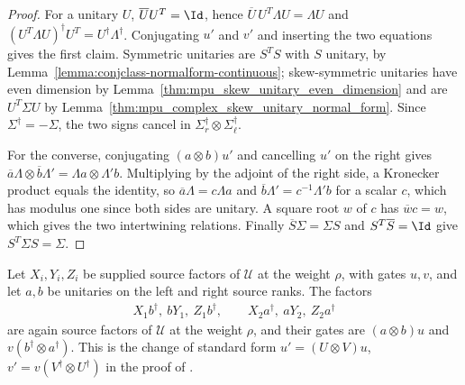 \begin{proof}
    \leanok
    For a unitary $U$, $\overline UU^T=\Id$, hence
    $\overline U\,U^T\Lambda U=\Lambda U$ and
    $(U^T\Lambda U)^\dagger U^T=U^\dagger\Lambda^\dagger$. Conjugating $u'$
    and $v'$ and inserting the two equations gives the first claim. Symmetric
    unitaries are $S^TS$ with $S$ unitary, by
    Lemma~\ref{lemma:conjclass-normalform-continuous}; skew-symmetric
    unitaries have even dimension by
    Lemma~\ref{thm:mpu_skew_unitary_even_dimension} and are $U^T\Sigma U$ by
    Lemma~\ref{thm:mpu_complex_skew_unitary_normal_form}. Since
    $\Sigma^\dagger=-\Sigma$, the two signs cancel in
    $\Sigma_r^\dagger\otimes\Sigma_\ell^\dagger$.

    For the converse, conjugating $(a\otimes b)u'$ and cancelling $u'$ on the
    right gives
    $\overline a\Lambda\otimes\overline b\Lambda'=\Lambda a\otimes\Lambda' b$.
    Multiplying by the adjoint of the right side, a Kronecker product equals
    the identity, so $\overline a\Lambda=c\Lambda a$ and
    $\overline b\Lambda'=c^{-1}\Lambda'b$ for a scalar $c$, which has modulus
    one since both sides are unitary. A square root $w$ of $c$ has
    $\overline wc=w$, which gives the two intertwining relations. Finally
    $\overline S\Sigma=\Sigma S$ and $S^T\overline S=\Id$ give
    $S^T\Sigma S=\Sigma$.
\end{proof}

\begin{definition}
    \label{def:mpu_source_factor_rank_gauge}
    \leanok
    Let $X_i,Y_i,Z_i$ be supplied source factors of $\mathcal U$ at the weight
    $\rho$, with gates $u,v$, and let $a,b$ be unitaries on the left and
    right source ranks. The factors
    \begin{align}
        X_1b^\dagger,\ bY_1,\ Z_1b^\dagger,\qquad
        X_2a^\dagger,\ aY_2,\ Z_2a^\dagger
    \end{align}
    are again source factors of $\mathcal U$ at the weight $\rho$, and their
    gates are $(a\otimes b)u$ and $v(b^\dagger\otimes a^\dagger)$. This is the
    change of standard form $u'=(U\otimes V)u$,
    $v'=v(V^\dagger\otimes U^\dagger)$ in the proof of
    \cite[Proposition~V.2]{Cirac2017MPU}.
\end{definition}

